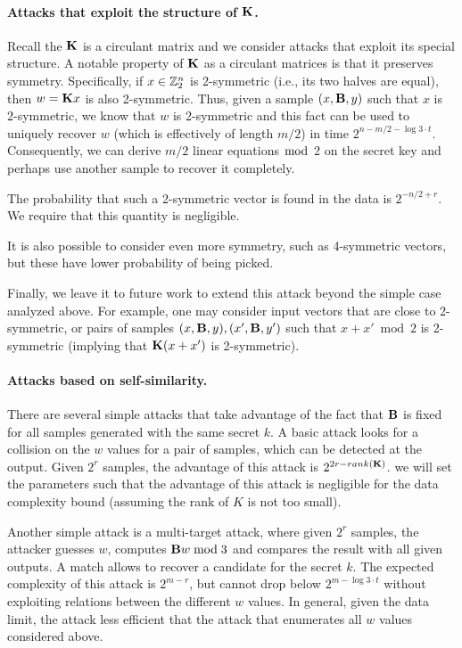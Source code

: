\paragraph{Attacks that exploit the structure of $\mat{K}$.}
Recall the $\mat{K}$ is a circulant matrix and we consider attacks that exploit its
special structure. A notable property of $\mat{K}$ as a circulant matrices is that it preserves symmetry.
Specifically, if $x \in \mathbb{Z}_2^n$ is 2-symmetric (i.e., its two halves are equal), 
then $w = \mat{K}x$ is also 2-symmetric. Thus, given a sample $(x,\mat{B},y)$
such that $x$ is 2-symmetric, we know that $w$ is 2-symmetric and this fact can be used to 
uniquely recover $w$ (which is effectively of length $m/2$) in time $2^{n - m/2 - \log 3 \cdot t}$.
Consequently, we can derive $m/2$ linear equations $\bmod$ 2 on the secret key 
and perhaps use another sample to recover it completely.

The probability that such a 2-symmetric vector is found in the data is $2^{-n/2 + r}$.
We require that this quantity is negligible.

It is also possible to consider even more symmetry, such as 4-symmetric vectors, 
but these have lower probability of being picked. 

Finally, we leave it to future work to extend this attack beyond the simple case analyzed above.
For example, one may consider input vectors that are close to 2-symmetric, 
or pairs of samples $(x,\mat{B},y),(x',\mat{B},y')$ such that $x + x' \bmod 2$ is 2-symmetric
(implying that $\mat{K} (x + x')$ is 2-symmetric). 
 

\paragraph{Attacks based on self-similarity.}

There are several simple attacks that take advantage of the fact that $\mat{B}$ is fixed for all samples generated with the same secret $k$.
A basic attack looks for a collision on the $w$ values for a pair of samples, which can be detected at the output.
Given $2^r$ samples, the advantage of this attack is $2^{2r - rank(\mat{K})}$.
we will set the parameters such that the advantage of this attack is negligible for the data complexity bound
(assuming the rank of $K$ is not too small).

Another simple attack is a multi-target attack, where given $2^r$ samples, the attacker guesses $w$, computes $\mat{B} w \bmod 3$ and compares the result with all given outputs. A match allows to recover a candidate for the secret $k$.
The expected complexity of this attack is $2^{m-r}$, but cannot drop below $2^{m - \log 3 \cdot t}$ without exploiting relations between the different $w$ values. In general, given the data limit, the attack less efficient that the attack that enumerates all $w$ values considered above.


